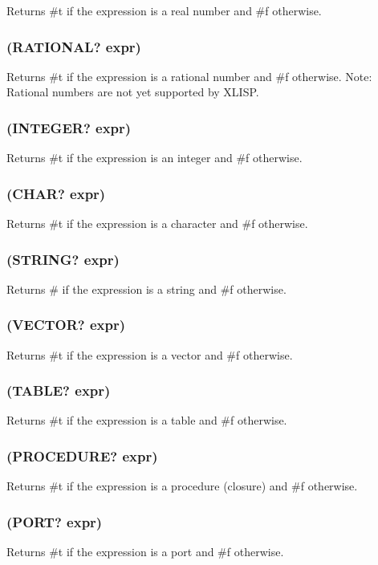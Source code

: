 \documentclass[11pt]{article}
\begin{document}
Returns \#t if the expression is a real number and \#f otherwise.
\subsubsection{(RATIONAL? expr)}
\label{sec-4-23-10}

Returns \#t if the expression is a rational number and \#f otherwise.
Note: Rational numbers are not yet supported by XLISP.
\subsubsection{(INTEGER? expr)}
\label{sec-4-23-11}

Returns \#t if the expression is an integer and \#f otherwise.
\subsubsection{(CHAR? expr)}
\label{sec-4-23-12}

Returns \#t if the expression is a character and \#f otherwise.
\subsubsection{(STRING? expr)}
\label{sec-4-23-13}

Returns \# if the expression is a string and \#f otherwise.
\subsubsection{(VECTOR? expr)}
\label{sec-4-23-14}

Returns \#t if the expression is a vector and \#f otherwise.
\subsubsection{(TABLE? expr)}
\label{sec-4-23-15}

Returns \#t if the expression is a table and \#f otherwise.
\subsubsection{(PROCEDURE? expr)}
\label{sec-4-23-16}

Returns \#t if the expression is a procedure (closure) and \#f
otherwise.
\subsubsection{(PORT? expr)}
\label{sec-4-23-17}

Returns \#t if the expression is a port and \#f otherwise.
\end{document}
